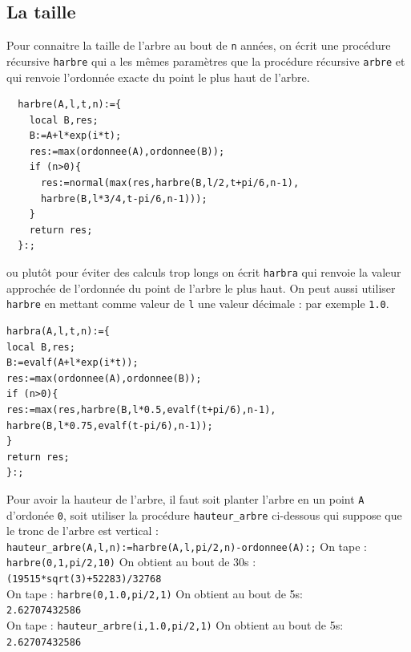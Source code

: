 \documentclass[a4paper,11pt]{book}
\begin{document}
\subsection{La taille}
Pour connaitre la taille de l'arbre au bout de {\tt n} ann\'ees, on \'ecrit une
proc\'edure r\'ecursive {\tt harbre} qui a les m\^emes param\`etres que la 
proc\'edure r\'ecursive {\tt arbre} et qui renvoie l'ordonn\'ee exacte du point
le plus haut de l'arbre. 
\begin{verbatim}
  harbre(A,l,t,n):={
    local B,res;
    B:=A+l*exp(i*t);
    res:=max(ordonnee(A),ordonnee(B));
    if (n>0){
      res:=normal(max(res,harbre(B,l/2,t+pi/6,n-1),
      harbre(B,l*3/4,t-pi/6,n-1)));
    } 
    return res;
  }:;
\end{verbatim}
ou plut\^ot pour \'eviter des calculs trop longs on \'ecrit {\tt harbra} qui 
renvoie la valeur approch\'ee de l'ordonn\'ee du 
point de l'arbre le plus haut. On peut aussi utiliser {\tt harbre} en mettant 
comme valeur de {\tt l} une valeur d\'ecimale : par exemple {\tt 1.0}.
\begin{verbatim}
harbra(A,l,t,n):={
local B,res;
B:=evalf(A+l*exp(i*t));
res:=max(ordonnee(A),ordonnee(B));
if (n>0){
res:=max(res,harbre(B,l*0.5,evalf(t+pi/6),n-1),
harbre(B,l*0.75,evalf(t-pi/6),n-1));
} 
return res;
}:;
\end{verbatim}
Pour avoir la hauteur de l'arbre, il faut soit planter l'arbre en un point 
{\tt A} d'ordon\'ee {\tt 0}, soit utiliser la proc\'edure {\tt hauteur\_arbre}
ci-dessous qui suppose que le tronc de l'arbre est vertical :\\
{\tt hauteur\_arbre(A,l,n):=harbre(A,l,pi/2,n)-ordonnee(A):;}
On tape :
{\tt harbre(0,1,pi/2,10)}
On obtient au bout de 30s :\\
{\tt (19515*sqrt(3)+52283)/32768}\\
On tape :
{\tt harbre(0,1.0,pi/2,1)}
On obtient au bout de 5s:\\
{\tt 2.62707432586}\\
On tape :
{\tt hauteur\_arbre(i,1.0,pi/2,1)}
On obtient au bout de 5s:\\
{\tt 2.62707432586}\\
\end{document}

